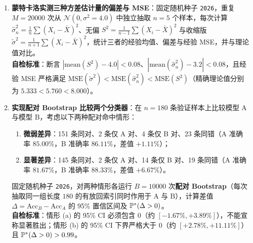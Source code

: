 \begin{enumerate}[label=\textbf{5.\arabic*}, resume]
  \item \textbf{蒙特卡洛实测三种方差估计量的偏差与 MSE}：固定随机种子 \texttt{2026}，重复 $M=20000$ 次从 $\mathcal{N}(0, \sigma^2=4.0)$ 中独立抽取 $n=5$ 个样本，每次计算 $\hat{\sigma}_n^2 = \frac{1}{n}\sum (X_i-\bar{X})^2$、无偏 $S^2 = \frac{1}{n-1}\sum (X_i-\bar{X})^2$ 与收缩版 $\tilde{\sigma}^2 = \frac{1}{n+1}\sum (X_i-\bar{X})^2$，统计三者的经验均值、偏差与经验 MSE，并与理论值对比。\\
  \textbf{自检标准}：断言 $|\text{mean}(S^2) - 4.0| < 0.08$、$|\text{mean}(\hat{\sigma}_n^2) - 3.2| < 0.08$，且经验 MSE 严格满足 $\mathrm{MSE}(\tilde{\sigma}^2) < \mathrm{MSE}(\hat{\sigma}_n^2) < \mathrm{MSE}(S^2)$（精确理论值分别为 $5.333 < 5.760 < 8.000$）。

\par\pagebreak[4]
  \item \textbf{实现配对 Bootstrap 比较两个分类器}：在 $n=180$ 条验证样本上比较模型 A 与模型 B，考虑以下两种配对命中情形：
  \begin{enumerate}[label=(\alph*)]
    \item \textbf{微弱差异}：151 条同对、2 条仅 A 对、4 条仅 B 对、23 条同错（A 准确率 $85.00\%$，B 准确率 $86.11\%$，差值 $+1.11\%$）；
    \item \textbf{显著差异}：145 条同对、2 条仅 A 对、14 条仅 B 对、19 条同错（A 准确率 $81.67\%$，B 准确率 $88.33\%$，差值 $+6.67\%$）。
  \end{enumerate}
  固定随机种子 \texttt{2026}，对两种情形各运行 $B=10000$ 次\textbf{配对 Bootstrap}（每次抽取同一组长度 $180$ 的有放回索引同时作用于 A 与 B），计算差值 $\Delta = \text{Acc}_B - \text{Acc}_A$ 的 95\% 置信区间及 $\mathbb{P}^*(\Delta > 0)$。\\
  \textbf{自检标准}：情形 (a) 的 95\% CI 必须包含 $0$（约 $[-1.67\%, +3.89\%]$），不能宣称显著胜出；情形 (b) 的 95\% CI 下界严格大于 $0$（约 $[+2.78\%, +11.11\%]$）且 $\mathbb{P}^*(\Delta > 0) > 0.99$。
\end{enumerate}
